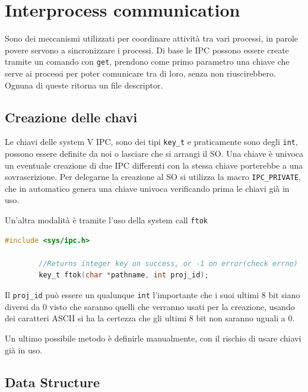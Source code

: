 \documentclass[a4paper, 12pt]{book}
\begin{document}
    \chapter{Interprocess communication}

    Sono dei meccanismi utilizzati per coordinare attività 
    tra vari processi, in parole povere servono a sincronizzare 
    i processi. Di base le IPC possono essere create tramite 
    un comando con \verb|get|, prendono come primo parametro 
    una chiave che serve ai processi per poter comunicare 
    tra di loro, senza non riuscirebbero. Ognuna di queste 
    ritorna un file descriptor.

    \section{Creazione delle chavi}

    Le chiavi delle system V IPC, sono dei tipi \verb|key_t|
    e praticamente sono degli \verb|int|, possono essere definite 
    da noi o lasciare che si arrangi il SO. Una chiave è univoca 
    un eventuale creazione di due IPC differenti con la stessa 
    chiave porterebbe a una sovrascrizione. Per delegarne 
    la creazione al SO si utilizza la macro \verb|IPC_PRIVATE|, 
    che in automatico genera una chiave univoca verificando 
    prima le chiavi già in uso.

    Un'altra modalità è tramite l'uso della system call 
    \verb|ftok| 
    \begin{lstlisting}[language=C]
        #include <sys/ipc.h>

        //Returns integer key on success, or -1 on error(check errno)
        key_t ftok(char *pathname, int proj_id);
    \end{lstlisting}
    Il \verb|proj_id| può essere un qualunque \verb|int| 
    l'importante che i suoi ultimi 8 bit siano diversi da 0
    visto che saranno quelli che verranno usati per la creazione, 
    usando dei caratteri ASCII si ha la certezza che gli 
    ultimi 8 bit non saranno uguali a 0.
    
    Un ultimo possibile metodo è definirle manualmente, con 
    il rischio di usare chiavi già in uso.

    \section{Data Structure}
\end{document}
